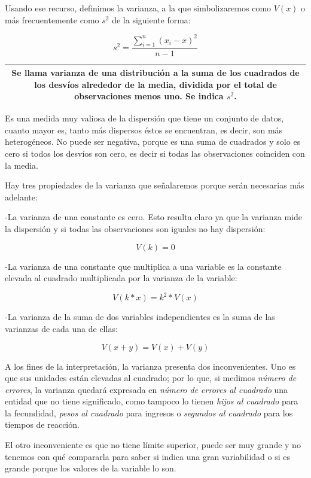 \documentclass[]{book}
\begin{document}
Usando ese recurso, definimos la varianza, a la que simbolizaremos como \(V(x)\) o más frecuentemente como \(s^2\) de la siguiente forma:

\[s^{2} = \frac{\sum_{i = 1}^{n}\left( x_{i} - \overline{x} \right)^{2}}{n - 1}\]

\begin{longtable}[]{@{}c@{}}
\toprule
\endhead
\begin{minipage}[t]{0.97\columnwidth}\centering
Se llama \textbf{varianza} de una distribución a la suma de los cuadrados de los desvíos alrededor de la media, dividida por el total de observaciones menos uno. Se indica \(s^2\).\strut
\end{minipage}\tabularnewline
\bottomrule
\end{longtable}

Es una medida muy valiosa de la dispersión que tiene un conjunto de
datos, cuanto mayor es, tanto más dispersos éstos se encuentran, es
decir, son más heterogéneos. No puede ser negativa, porque es una suma de cuadrados y solo es cero si todos los desvíos son cero, es decir si todas las observaciones coinciden con la media.

Hay tres propiedades de la varianza que señalaremos porque serán
necesarias más adelante:

-La varianza de una constante es cero. Esto resulta claro ya que la
varianza mide la dispersión y si todas las observaciones son iguales no hay dispersión:

\[V\left( k \right) = 0\]

-La varianza de una constante que multiplica a una variable es la
constante elevada al cuadrado multiplicada por la varianza de la
variable:

\[V\left( k*x \right) = k^{2}*V(x)\]

-La varianza de la suma de dos variables independientes es la suma de
las varianzas de cada una de ellas:

\[V\left( x + y \right) = V\left( x \right) + V(y)\]

A los fines de la interpretación, la varianza presenta dos
inconvenientes. Uno es que sus unidades están elevadas al cuadrado; por lo que, si medimos \emph{número de errores}, la varianza quedará expresada en \emph{número de errores al cuadrado} una entidad que no tiene significado, como tampoco lo tienen \emph{hijos al cuadrado} para la fecundidad, \emph{pesos al cuadrado} para ingresos o \emph{segundos al cuadrado} para los tiempos de reacción.

El otro inconveniente es que no tiene límite superior, puede ser muy
grande y no tenemos con qué compararla para saber si indica una gran
variabilidad o si es grande porque los valores de la variable lo son.
\end{document}

